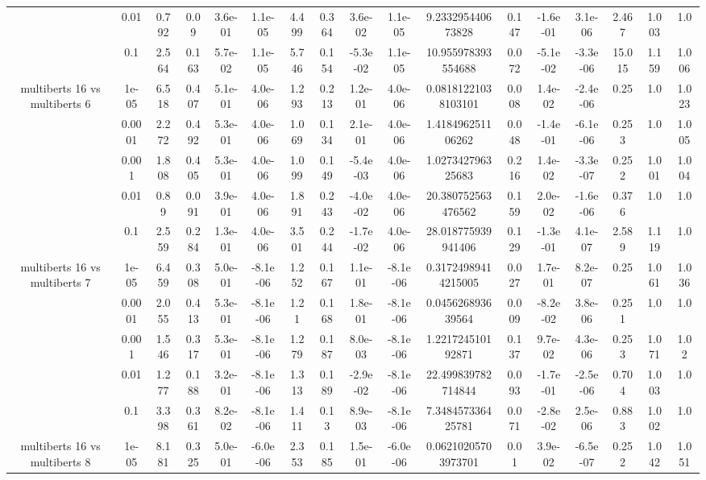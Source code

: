 \begin{tabular}{|c|c|c|c|c|c|c|c|c|c|c|c|c|c|c|c|c|}
 & 0.01 & 0.792 & 0.09 & 3.6e-01 & 1.1e-05 & 4.499 & 0.364 & 3.6e-02 & 1.1e-05 & 9.233295440673828 & 0.147 & -1.6e-01 & 3.1e-06 & 2.467 & 1.003 & 1.0 \\
 & 0.1 & 2.564 & 0.163 & 5.7e-02 & 1.1e-05 & 5.746 & 0.154 & -5.3e-02 & 1.1e-05 & 10.955978393554688 & 0.072 & -5.1e-02 & -3.3e-06 & 15.015 & 1.159 & 1.006 \\
\hline
\multirow{5}{*}{multiberts 16 vs multiberts 6} & 1e-05 & 6.518 & 0.407 & 5.1e-01 & 4.0e-06 & 1.293 & 0.213 & 1.2e-01 & 4.0e-06 & 0.08181221038103101 & 0.008 & 1.4e-02 & -2.4e-06 & 0.25 & 1.0 & 1.023 \\
 & 0.0001 & 2.272 & 0.492 & 5.3e-01 & 4.0e-06 & 1.069 & 0.134 & 2.1e-01 & 4.0e-06 & 1.418496251106262 & 0.048 & -1.4e-01 & -6.1e-06 & 0.253 & 1.0 & 1.005 \\
 & 0.001 & 1.808 & 0.405 & 5.3e-01 & 4.0e-06 & 1.099 & 0.149 & -5.4e-03 & 4.0e-06 & 1.027342796325683 & 0.216 & 1.4e-02 & -3.3e-07 & 0.252 & 1.001 & 1.004 \\
 & 0.01 & 0.89 & 0.091 & 3.9e-01 & 4.0e-06 & 1.891 & 0.243 & -4.0e-02 & 4.0e-06 & 20.380752563476562 & 0.159 & 2.0e-02 & -1.6e-06 & 0.376 & 1.0 & 1.0 \\
 & 0.1 & 2.559 & 0.284 & 1.3e-01 & 4.0e-06 & 3.501 & 0.244 & -1.7e-02 & 4.0e-06 & 28.018775939941406 & 0.129 & -1.3e-01 & 4.1e-07 & 2.589 & 1.119 & 1.0 \\
\hline
\multirow{5}{*}{multiberts 16 vs multiberts 7} & 1e-05 & 6.459 & 0.308 & 5.0e-01 & -8.1e-06 & 1.252 & 0.167 & 1.1e-01 & -8.1e-06 & 0.31724989414215005 & 0.027 & 1.7e-01 & 8.2e-07 & 0.25 & 1.061 & 1.036 \\
 & 0.0001 & 2.055 & 0.413 & 5.3e-01 & -8.1e-06 & 1.21 & 0.168 & 1.8e-01 & -8.1e-06 & 0.045626893639564 & 0.009 & -8.2e-02 & 3.8e-06 & 0.251 & 1.0 & 1.0 \\
 & 0.001 & 1.546 & 0.317 & 5.3e-01 & -8.1e-06 & 1.279 & 0.187 & 8.0e-03 & -8.1e-06 & 1.221724510192871 & 0.137 & 9.7e-02 & 4.3e-06 & 0.253 & 1.071 & 1.02 \\
 & 0.01 & 1.277 & 0.188 & 3.2e-01 & -8.1e-06 & 1.313 & 0.189 & -2.9e-02 & -8.1e-06 & 22.499839782714844 & 0.093 & -1.7e-01 & -2.5e-06 & 0.704 & 1.003 & 1.0 \\
 & 0.1 & 3.398 & 0.361 & 8.2e-02 & -8.1e-06 & 1.411 & 0.13 & 8.9e-03 & -8.1e-06 & 7.348457336425781 & 0.071 & -2.8e-02 & 2.5e-06 & 0.883 & 1.002 & 1.0 \\
\hline
\multirow{5}{*}{multiberts 16 vs multiberts 8} & 1e-05 & 8.181 & 0.325 & 5.0e-01 & -6.0e-06 & 2.353 & 0.185 & 1.5e-01 & -6.0e-06 & 0.06210205703973701 & 0.01 & 3.9e-02 & -6.5e-07 & 0.252 & 1.042 & 1.051 \\

\end{tabular}
